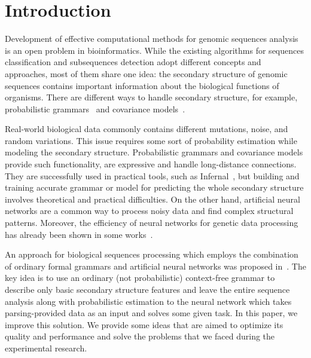 \section{Introduction}
Development of effective computational methods for genomic sequences analysis is an open problem in bioinformatics.
While the existing algorithms for sequences classification and subsequences detection adopt different concepts and approaches, most of them share one idea: the secondary structure of genomic sequences contains important information about the biological functions of organisms.
There are different ways to handle secondary structure, for example, probabilistic grammars~\cite{dowell2004evaluation,knudsen1999rna} and covariance models~\cite{10.1093/nar/22.11.2079,EddyDurbin}.

Real-world biological data commonly contains different mutations, noise, and random variations.
This issue requires some sort of probability estimation while modeling the secondary structure.
Probabilistic grammars and covariance models provide such functionality, are expressive and handle long-distance connections.
They are successfully used in practical tools, such as Infernal~\cite{Infernal}, but building and training accurate grammar or model for predicting the whole secondary structure involves theoretical and practical difficulties.
On the other hand, artificial neural networks are a common way to process noisy data and find complex structural patterns.
Moreover, the efficiency of neural networks for genetic data processing has already been shown in some works~\cite{Humidor,ANN,Lu2019,Singh2019,10.5555/166459.166465}.

An approach for biological sequences processing which employs the combination of ordinary formal grammars and artificial neural networks was proposed in~\cite{grigorevcomposition}.  
The key idea is to use an ordinary (not probabilistic)  context-free grammar to describe only basic secondary structure features and leave the entire sequence analysis along with probabilistic estimation to the neural network which takes parsing-provided data as an input and solves some given task.
In this paper, we improve this solution. 
We provide some ideas that are aimed to optimize its quality and performance and solve the problems that we faced during the experimental research.

